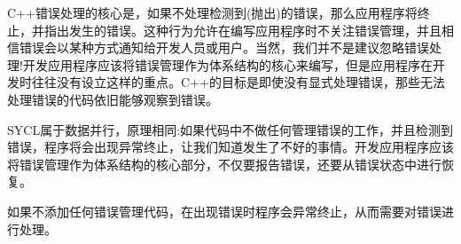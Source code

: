 C++错误处理的核心是，如果不处理检测到(抛出)的错误，那么应用程序将终止，并指出发生的错误。这种行为允许在编写应用程序时不关注错误管理，并且相信错误会以某种方式通知给开发人员或用户。当然，我们并不是建议忽略错误处理!开发应用程序应该将错误管理作为体系结构的核心来编写，但是应用程序在开发时往往没有设立这样的重点。C++的目标是即使没有显式处理错误，那些无法处理错误的代码依旧能够观察到错误。\par

SYCL属于数据并行，原理相同:如果代码中不做任何管理错误的工作，并且检测到错误，程序将会出现异常终止，让我们知道发生了不好的事情。开发应用程序应该将错误管理作为体系结构的核心部分，不仅要报告错误，还要从错误状态中进行恢复。\par

\begin{tcolorbox}[colback=red!5!white,colframe=red!75!black]
如果不添加任何错误管理代码，在出现错误时程序会异常终止，从而需要对错误进行处理。
\end{tcolorbox}


























